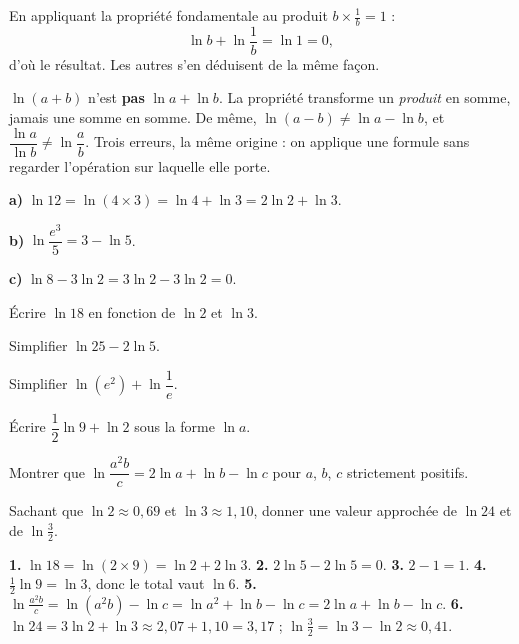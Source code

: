 \begin{demonstration}[de $\ln\frac1b = -\ln b$]
En appliquant la propriété fondamentale au produit $b\times\frac1b = 1$ :
\[
  \ln b+\ln\frac1b = \ln 1 = 0,
\]
d'où le résultat. Les autres s'en déduisent de la même façon.
\end{demonstration}

\begin{erreurclassique}
$\ln(a+b)$ n'est \textbf{pas} $\ln a+\ln b$. La propriété transforme un
\emph{produit} en somme, jamais une somme en somme. De même,
$\ln(a-b) \neq \ln a-\ln b$, et $\dfrac{\ln a}{\ln b} \neq \ln\dfrac ab$.
Trois erreurs, la même origine : on applique une formule sans regarder
l'opération sur laquelle elle porte.
\end{erreurclassique}

\begin{exemple}
\textbf{a)} $\ln 12 = \ln(4\times3) = \ln 4+\ln 3 = 2\ln 2+\ln 3$.

\textbf{b)} $\ln\dfrac{e^{3}}{5} = 3-\ln 5$.

\textbf{c)} $\ln 8-3\ln 2 = 3\ln 2-3\ln 2 = 0$.
\end{exemple}

\begin{entrainement}
\exo[\niveau{1}] Écrire $\ln 18$ en fonction de $\ln 2$ et $\ln 3$.

\exo[\niveau{1}] Simplifier $\ln 25-2\ln 5$.

\exo[\niveau{2}] Simplifier $\ln\left(e^{2}\right)+\ln\dfrac1e$.

\exo[\niveau{2}] Écrire $\dfrac12\ln 9+\ln 2$ sous la forme $\ln a$.

\exo[\niveau{2}] Montrer que $\ln\dfrac{a^{2}b}{c} = 2\ln a+\ln b-\ln c$
pour $a$, $b$, $c$ strictement positifs.

\exo[\niveau{3}] Sachant que $\ln 2 \approx 0{,}69$ et
$\ln 3 \approx 1{,}10$, donner une valeur approchée de $\ln 24$ et de
$\ln \frac32$.
\end{entrainement}

\begin{corrige}
\textbf{1.} $\ln18 = \ln(2\times9) = \ln2+2\ln3$.
\textbf{2.} $2\ln5-2\ln5 = 0$.
\textbf{3.} $2-1 = 1$.
\textbf{4.} $\frac12\ln9 = \ln3$, donc le total vaut $\ln6$.
\textbf{5.} $\ln\frac{a^{2}b}{c} = \ln\left(a^{2}b\right)-\ln c
= \ln a^{2}+\ln b-\ln c = 2\ln a+\ln b-\ln c$.
\textbf{6.} $\ln24 = 3\ln2+\ln3 \approx 2{,}07+1{,}10 = 3{,}17$ ;
$\ln\frac32 = \ln3-\ln2 \approx 0{,}41$.
\end{corrige}


